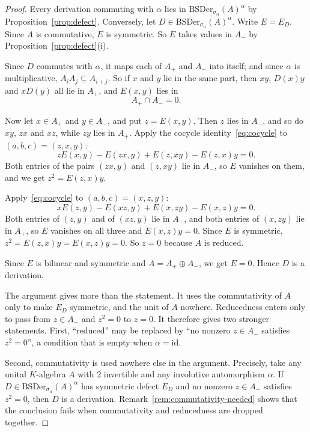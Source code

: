 \documentclass[]{interact}
\theoremstyle{plain}
\theoremstyle{definition}
\theoremstyle{remark}
\newcommand{\BSDer}{\mathrm{BSDer}}
\begin{document}
\begin{proof}
Every derivation commuting with $\alpha$ lies in $\BSDer_{\sigma_\alpha}(A)^\alpha$ by Proposition~\ref{prop:defect}.
Conversely, let $D \in \BSDer_{\sigma_\alpha}(A)^\alpha$.
Write $E = E_D$.
Since $A$ is commutative, $E$ is symmetric.
So $E$ takes values in $A_-$ by Proposition~\ref{prop:defect}(i).

Since $D$ commutes with $\alpha$, it maps each of $A_+$ and $A_-$ into itself; and since $\alpha$ is multiplicative, $A_iA_j \subseteq A_{i+j}$.
So if $x$ and $y$ lie in the same part, then $xy$, $D(x)y$ and $xD(y)$ all lie in $A_+$, and $E(x,y)$ lies in
\[
A_+ \cap A_- = 0.
\]

Now let $x \in A_+$ and $y \in A_-$, and put $z = E(x,y)$.
Then $z$ lies in $A_-$, and so do $xy$, $zx$ and $xz$, while $zy$ lies in $A_+$.
Apply the cocycle identity~\eqref{eq:cocycle} to $(a,b,c) = (z,x,y)$:
\[
zE(x,y) - E(zx,y) + E(z,xy) - E(z,x)y = 0.
\]
Both entries of the pairs $(zx,y)$ and $(z,xy)$ lie in $A_-$, so $E$ vanishes on them, and we get $z^2 = E(z,x)y$.

Apply~\eqref{eq:cocycle} to $(a,b,c) = (x,z,y)$:
\[
xE(z,y) - E(xz,y) + E(x,zy) - E(x,z)y = 0.
\]
Both entries of $(z,y)$ and of $(xz,y)$ lie in $A_-$, and both entries of $(x,zy)$ lie in $A_+$, so $E$ vanishes on all three and $E(x,z)y = 0$.
Since $E$ is symmetric, $z^2 = E(z,x)y = E(x,z)y = 0$.
So $z = 0$ because $A$ is reduced.

Since $E$ is bilinear and symmetric and $A = A_+ \oplus A_-$, we get $E = 0$.
Hence $D$ is a derivation.

The argument gives more than the statement.
It uses the commutativity of $A$ only to make $E_D$ symmetric, and the unit of $A$ nowhere.
Reducedness enters only to pass from $z \in A_-$ and $z^2 = 0$ to $z = 0$.
It therefore gives two stronger statements.
First, ``reduced'' may be replaced by ``no nonzero $z \in A_-$ satisfies $z^2 = 0$'', a condition that is empty when $\alpha = \mathrm{id}$.

Second, commutativity is used nowhere else in the argument.
Precisely, take any unital $K$-algebra $A$ with $2$ invertible and any involutive automorphism $\alpha$.
If $D \in \BSDer_{\sigma_\alpha}(A)^\alpha$ has symmetric defect $E_D$ and no nonzero $z \in A_-$ satisfies $z^2 = 0$, then $D$ is a derivation.
Remark~\ref{rem:commutativity-needed} shows that the conclusion fails when commutativity and reducedness are dropped together.
\end{proof}
\end{document}
